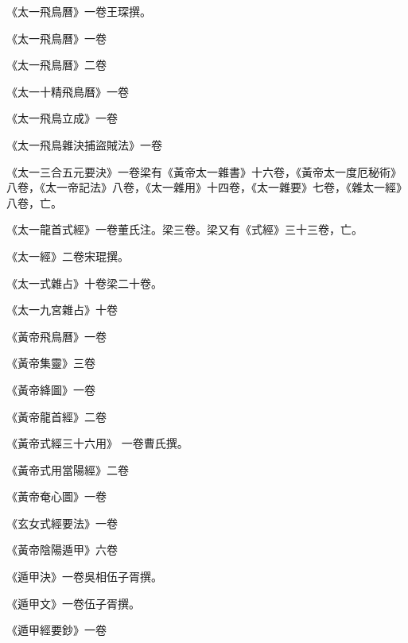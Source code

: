\begin{pinyinscope}
 《太一飛鳥曆》一卷王琛撰。



 《太一飛鳥曆》一卷



 《太一飛鳥曆》二卷



 《太一十精飛鳥曆》一卷



 《太一飛鳥立成》一卷



 《太一飛鳥雜決捕盜賊法》一卷



 《太一三合五元要決》一卷梁有《黃帝太一雜書》十六卷，《黃帝太一度厄秘術》八卷，《太一帝記法》八卷，《太一雜用》十四卷，《太一雜要》七卷，《雜太一經》八卷，亡。



 《太一龍首式經》一卷董氏注。梁三卷。梁又有《式經》三十三卷，亡。



 《太一經》二卷宋琨撰。



 《太一式雜占》十卷梁二十卷。



 《太一九宮雜占》十卷



 《黃帝飛鳥曆》一卷



 《黃帝集靈》三卷



 《黃帝絳圖》一卷



 《黃帝龍首經》二卷



 《黃帝式經三十六用》
 一卷曹氏撰。



 《黃帝式用當陽經》二卷



 《黃帝奄心圖》一卷



 《玄女式經要法》一卷



 《黃帝陰陽遁甲》六卷



 《遁甲決》一卷吳相伍子胥撰。



 《遁甲文》一卷伍子胥撰。



 《遁甲經要鈔》一卷




\end{pinyinscope}
